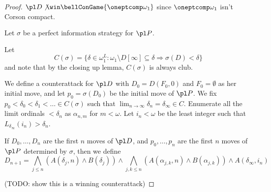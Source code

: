 \begin{proof}
  $\pl D\not\win\bellConGame{\oneptcomp\omega_1}$ since $\oneptcomp\omega_1$
  isn't Corson compact.

  Let $\sigma$ be a perfect information strategy for $\pl P$.

  Let
  \[
    C(\sigma)
      =
    \{
      \delta\in\omega_1^L
        :
      \omega_1\setminus D[\infty] \subseteq \delta
        \Rightarrow
      \sigma(D) < \delta
    \}
  \]
  and note that by the closing up lemma, $C(\sigma)$ is always club.

  We define a counterattack for $\pl D$ with $D_0=D(F_0,0)$ and
  $F_0=\emptyset$ as her
  initial move, and let $p_0=\sigma(D_0)$ be the initial move of $\pl P$.
  We fix $p_0<\delta_0<\delta_1<\dots\in C(\sigma)$ such that
  $\lim_{n\to\infty}\delta_n=\delta_\infty\in C$. Enumerate all the
  limit ordinals $<\delta_n$ as $\alpha_{n,m}$ for $m<\omega$. Let
  $i_n<\omega$ be the least integer such that
  $L_{\delta_\infty}(i_n)>\delta_n$.

  If $D_0,\dots,D_n$ are the first $n$ moves of $\pl D$, and
  $p_0,\dots,p_n$ are the first $n$ moves of $\pl P$ determined by $\sigma$,
  then we define
    \[
      D_{n+1}
        =
      \bigwedge_{j\leq n}
      \left(
        A(\delta_j,n)
          \wedge
        B(\delta_j)
      \right)
        \wedge
      \bigwedge_{j,k\leq n}
      \left(
        A(\alpha_{j,k},n)
          \wedge
        B(\alpha_{j,k})
      \right)
        \wedge
      A(\delta_\infty,i_n)
    \]

  (TODO: show this is a winning counterattack)
\end{proof}